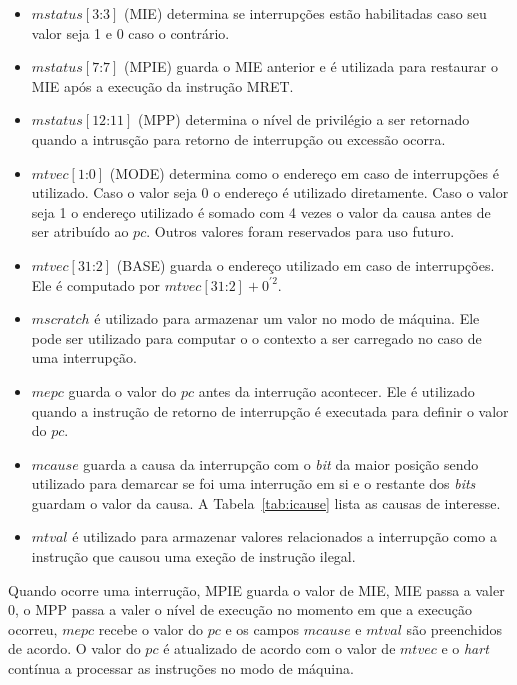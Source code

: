   \begin{itemize}
    \item $mstatus[3\text{:}3]$ (MIE) determina se interrupções estão habilitadas caso seu valor seja 1 e 0 caso o contrário.
    \item $mstatus[7\text{:}7]$ (MPIE) guarda o MIE anterior e é utilizada para restaurar o MIE após a execução
    da instrução MRET.
    \item $mstatus[12\text{:}11]$ (MPP) determina o nível de privilégio a ser retornado quando a intrusção para retorno de 
          interrupção ou excessão ocorra.
    \item $mtvec[1\text{:}0]$ (MODE) determina como o endereço em caso de interrupções é utilizado. Caso o valor seja
          0 o endereço é utilizado diretamente. Caso o valor seja 1 o endereço utilizado é somado com 4 vezes o valor
          da causa antes de ser atribuído ao $pc$. Outros valores foram reservados para uso futuro.
    \item $mtvec[31\text{:}2]$ (BASE) guarda o endereço utilizado em caso de interrupções. Ele é computado por
          $ mtvec[31\text{:}2] + 0^{'2} $.
    \item $mscratch$ é utilizado para armazenar um valor no modo de máquina. Ele pode ser utilizado para computar o
          o contexto a ser carregado no caso de uma interrupção.
    \item $mepc$ guarda o valor do $pc$ antes da interrução acontecer. Ele é utilizado quando a instrução de retorno de
          interrupção é executada para definir o valor do $pc$.
    \item $mcause$ guarda a causa da interrupção com o \emph{bit} da maior posição sendo utilizado para demarcar se foi
          uma interrução em si e o restante dos \emph{bits} guardam o valor da causa.
          A Tabela~\ref{tab:icause} lista as causas de interesse.
    \item $mtval$ é utilizado para armazenar valores relacionados a interrupção como a instrução que causou uma exeção
          de instrução ilegal.
  \end{itemize}

  Quando ocorre uma interrução, MPIE guarda o valor de MIE, MIE passa a valer 0, o MPP passa a valer o nível
  de execução no momento em que a execução ocorreu, $mepc$ recebe o valor do $pc$ e os campos $mcause$ e $mtval$
  são preenchidos de acordo. O valor do $pc$ é atualizado de acordo com o valor de $mtvec$ e o \emph{hart}
  contínua a processar as instruções no modo de máquina.

